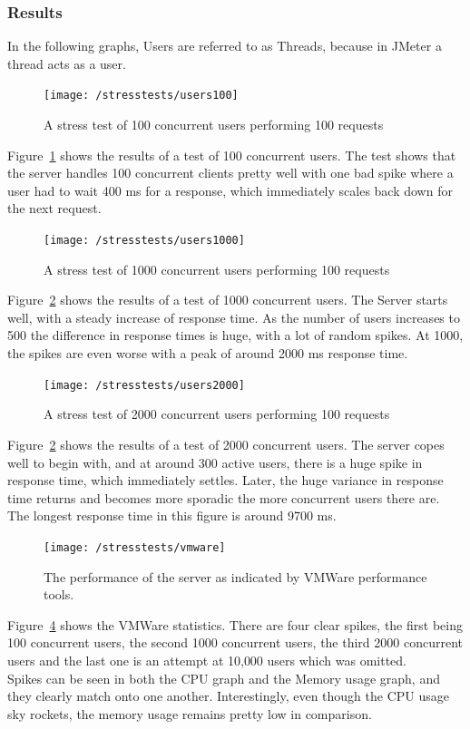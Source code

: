 \documentclass[draft,preprint,12pt,3p]{elsarticle}
\begin{document}
\subsubsection{Results}
In the following graphs, Users are referred to as Threads, because in JMeter a thread acts as a user.
\begin{figure}[H]
    \centering
    \texttt{[image: /stresstests/users100]}
    \caption {A stress test of 100 concurrent users performing 100 requests}
    \label{fig:stress100}
\end{figure}
Figure~\ref{fig:stress100} shows the results of a test of 100 concurrent users. The test shows that the server handles 100 concurrent clients pretty well with one bad spike where a user had to wait 400 ms for a response, which immediately scales back down for the next request.
\begin{figure}[H]
    \centering
    \texttt{[image: /stresstests/users1000]}
    \caption {A stress test of 1000 concurrent users performing 100 requests}
    \label{fig:stress1000}
\end{figure}
Figure~\ref{fig:stress1000} shows the results of a test of 1000 concurrent users. The Server starts well, with a steady increase of response time. As the number of users increases to 500 the difference in response times is huge, with a lot of random spikes. At 1000, the spikes are even worse with a peak of around 2000 ms response time.
\begin{figure}[H]
    \centering
    \texttt{[image: /stresstests/users2000]}
    \caption {A stress test of 2000 concurrent users performing 100 requests}
    \label{fig:stress2000}
\end{figure}
Figure~\ref{fig:stress1000} shows the results of a test of 2000 concurrent users. The server copes well to begin with, and at around 300 active users, there is a huge spike in response time, which immediately settles. Later, the huge variance in response time returns and becomes more sporadic the more concurrent users there are. The longest response time in this figure is around 9700 ms.

\begin{figure}[H]
    \centering
    \texttt{[image: /stresstests/vmware]}
    \caption {The performance of the server as indicated by VMWare performance tools.}
    \label{fig:stressvmware}
\end{figure}
Figure~\ref{fig:stressvmware} shows the VMWare statistics. There are four clear spikes, the first being 100 concurrent users, the second 1000 concurrent users, the third 2000 concurrent users and the last one is an attempt at 10,000 users which was omitted.\\
Spikes can be seen in both the CPU graph and the Memory usage graph, and they clearly match onto one another. Interestingly, even though the CPU usage sky rockets, the memory usage remains pretty low in comparison.
\end{document}
